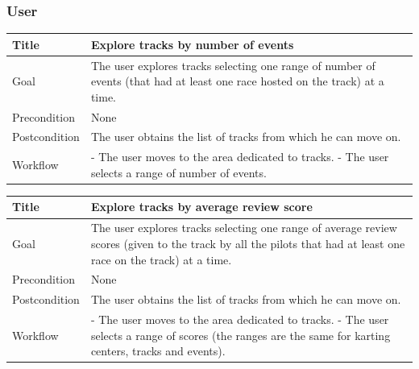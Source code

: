 \documentclass{beamer}
\begin{document}
\begin{frame}
    \frametitle{User}
    \begin{table}
        \tiny
        \begin{tabular}{|p{2cm}|p{6cm}|}
        \hline
        Title & \textbf{Explore tracks by number of events} \\
        \hline
        Goal & The user explores tracks selecting one range of number of events
        (that had at least one race hosted on the track) at a time. \\
        \hline
        Precondition & None \\
        \hline
        Postcondition & The user obtains the list of tracks from which he can move on.\\
        \hline
        Workflow &
        - The user moves to the area dedicated to tracks. \newline
        - The user selects a range of number of events. \\
        \hline
        \end{tabular}
\end{table}

\begin{table}
    \tiny
    \begin{tabular}{|p{2cm}|p{6cm}|}
    \hline
    Title & \textbf{Explore tracks by average review score} \\
    \hline
    Goal & The user explores tracks selecting one range of average review scores (given to the track by all the pilots
    that had at least one race on the track) at a time. \\
    \hline
    Precondition & None \\
    \hline
    Postcondition & The user obtains the list of tracks from which he can move on.\\
    \hline
    Workflow &
    - The user moves to the area dedicated to tracks. \newline
    - The user selects a range of scores (the ranges are the same for karting centers, tracks and events). \\
    \hline
    \end{tabular}
\end{table}
\end{frame}


\end{document}
